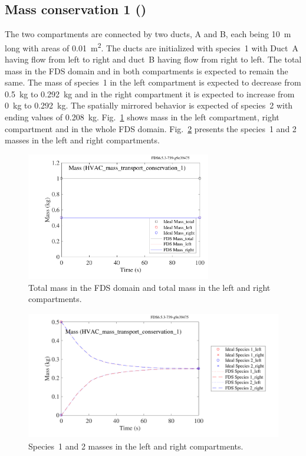 \documentclass[11pt]{book}
\begin{document}
\subsection{Mass conservation 1 (\texorpdfstring{}{HVAC\_mass\_transport\_conservation\_1})}
\label{HVAC_mass_transport_conservation_1}
The two compartments are connected by two ducts, A and B, each being \SI{10}{\meter} long with areas of \SI{0.01}{\meter\squared}. The ducts are initialized with species~1 with Duct~A having flow from left to right and duct~B having flow from right to left. The total mass in the FDS domain and in both compartments is expected to remain the same. The mass of species~1 in the left compartment is expected to decrease from \SI{0.5}{\kilogram} to \SI{0.292}{\kilogram} and in the right compartment it is expected to increase from \SI{0}{\kilogram} to \SI{0.292}{\kilogram}. The spatially mirrored behavior is expected of species~2 with ending values of \SI{0.208}{\kilogram}. Fig.~\ref{fig_HVAC_mass_transport_conservation_1a} shows mass in the left compartment, right compartment and in the whole FDS domain. Fig.~\ref{fig_HVAC_mass_transport_conservation_1b} presents the species~1 and 2 masses in the left and right compartments.

\begin{figure}[ht]
\centering
\includegraphics[height=2.2in]{SCRIPT_FIGURES/HVAC_mass_transport_conservation_1a}
\caption[ test case]{Total mass in the FDS domain and total mass in the left and right compartments.}
\label{fig_HVAC_mass_transport_conservation_1a}
\end{figure}

\begin{figure}[ht]
\centering
\includegraphics[height=2.2in]{SCRIPT_FIGURES/HVAC_mass_transport_conservation_1b}
\caption[ test case]{Species~1 and 2 masses in the left and right compartments.}
\label{fig_HVAC_mass_transport_conservation_1b}
\end{figure}
\end{document}
